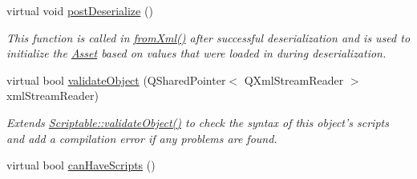 \begin{DoxyCompactItemize}
virtual void \hyperlink{class_picto_1_1_analysis_script_holder_ae0d42be0c831a16dfea55803fa124e92}{post\-Deserialize} ()
\begin{DoxyCompactList}\small\item\em This function is called in \hyperlink{class_picto_1_1_asset_a8bed4da09ecb1c07ce0dab313a9aba67}{from\-Xml()} after successful deserialization and is used to initialize the \hyperlink{class_picto_1_1_asset}{Asset} based on values that were loaded in during deserialization. \end{DoxyCompactList}\item 
\hypertarget{class_picto_1_1_analysis_script_holder_aecdb2b312b52fe6c9575fb0e6dc0f844}{virtual bool \hyperlink{class_picto_1_1_analysis_script_holder_aecdb2b312b52fe6c9575fb0e6dc0f844}{validate\-Object} (Q\-Shared\-Pointer$<$ Q\-Xml\-Stream\-Reader $>$ xml\-Stream\-Reader)}\label{class_picto_1_1_analysis_script_holder_aecdb2b312b52fe6c9575fb0e6dc0f844}

\begin{DoxyCompactList}\small\item\em Extends \hyperlink{class_picto_1_1_scriptable_ab6e2944c43a3b5d418bf7b251594386d}{Scriptable\-::validate\-Object()} to check the syntax of this object's scripts and add a compilation error if any problems are found. \end{DoxyCompactList}\item 
\hypertarget{class_picto_1_1_analysis_script_holder_a11d11762bc1afd555b1e7f92d29dffcd}{virtual bool \hyperlink{class_picto_1_1_analysis_script_holder_a11d11762bc1afd555b1e7f92d29dffcd}{can\-Have\-Scripts} ()}\label{class_picto_1_1_analysis_script_holder_a11d11762bc1afd555b1e7f92d29dffcd}


\end{DoxyCompactItemize}

